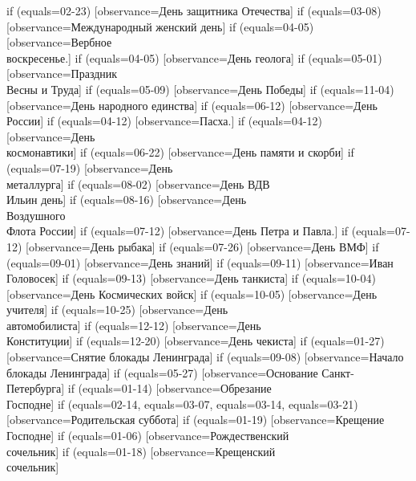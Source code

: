 {  if (equals=02-23) [observance=День защитника Отечества]
  if (equals=03-08) [observance=Международный женский день]
  if (equals=04-05) [observance=Вербное\\ воскресенье.]
  if (equals=04-05) [observance=День геолога]
  if (equals=05-01) [observance=Праздник\\ Весны и Труда]
  if (equals=05-09) [observance=День Победы]
  if (equals=11-04) [observance=День народного единства]
  if (equals=06-12) [observance=День России]
  if (equals=04-12) [observance=Пасха.]
  if (equals=04-12) [observance=День\\ космонавтики]
  if (equals=06-22) [observance=День памяти и скорби]
  if (equals=07-19) [observance=День\\ металлурга]
  if (equals=08-02) [observance=День ВДВ\\ Ильин день]
  if (equals=08-16) [observance=День\\ Воздушного\\ Флота России]
  if (equals=07-12) [observance=День Петра и Павла.]
  if (equals=07-12) [observance=День рыбака]
  if (equals=07-26) [observance=День ВМФ]
  if (equals=09-01) [observance=День знаний]
  if (equals=09-11) [observance=Иван Головосек]
  if (equals=09-13) [observance=День танкиста]
  if (equals=10-04) [observance=День Космических войск]
  if (equals=10-05) [observance=День учителя]
  if (equals=10-25) [observance=День\\ автомобилиста]
  if (equals=12-12) [observance=День\\ Конституции]
  if (equals=12-20) [observance=День чекиста]
  if (equals=01-27) [observance=Снятие блокады Ленинграда]
  if (equals=09-08) [observance=Начало блокады Ленинграда]
  if (equals=05-27) [observance=Основание Санкт-Петербурга]
  if (equals=01-14) [observance=Обрезание\\ Господне]
  if (equals=02-14,
  	equals=03-07,
	equals=03-14,
	equals=03-21) [observance=Родительская суббота]
  if (equals=01-19) [observance=Крещение\\ Господне]
  if (equals=01-06) [observance=Рождественский\\ сочельник]
  if (equals=01-18) [observance=Крещенский\\ сочельник]
}

